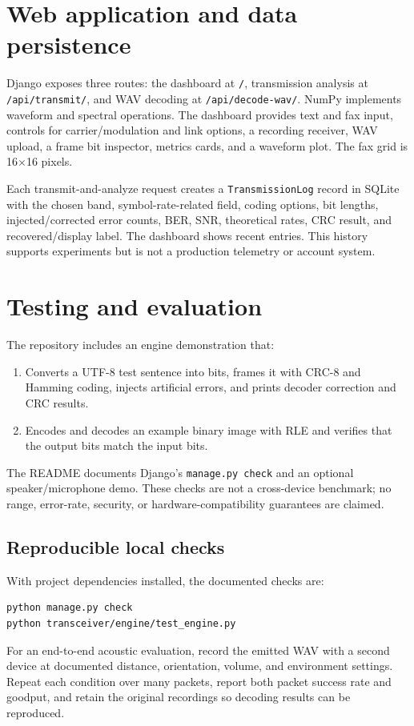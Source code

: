 \documentclass[11pt,a4paper]{article}
\begin{document}
\section{Web application and data persistence}
\label{sec:web}

Django exposes three routes: the dashboard at \texttt{/}, transmission analysis at \texttt{/api/transmit/}, and WAV decoding at \texttt{/api/decode-wav/}. NumPy implements waveform and spectral operations. The dashboard provides text and fax input, controls for carrier/modulation and link options, a recording receiver, WAV upload, a frame bit inspector, metrics cards, and a waveform plot. The fax grid is 16$\times$16 pixels.

Each transmit-and-analyze request creates a \texttt{TransmissionLog} record in SQLite with the chosen band, symbol-rate-related field, coding options, bit lengths, injected/corrected error counts, BER, SNR, theoretical rates, CRC result, and recovered/display label. The dashboard shows recent entries. This history supports experiments but is not a production telemetry or account system.

\section{Testing and evaluation}
\label{sec:testing}

The repository includes an engine demonstration that:
\begin{enumerate}
    \item Converts a UTF-8 test sentence into bits, frames it with CRC-8 and Hamming coding, injects artificial errors, and prints decoder correction and CRC results.
    \item Encodes and decodes an example binary image with RLE and verifies that the output bits match the input bits.
\end{enumerate}
The README documents Django's \texttt{manage.py check} and an optional speaker/microphone demo. These checks are not a cross-device benchmark; no range, error-rate, security, or hardware-compatibility guarantees are claimed.

\subsection{Reproducible local checks}
With project dependencies installed, the documented checks are:
\begin{lstlisting}[basicstyle=\ttfamily\small,frame=single,backgroundcolor=\color{lightgray}]
python manage.py check
python transceiver/engine/test_engine.py
\end{lstlisting}
For an end-to-end acoustic evaluation, record the emitted WAV with a second device at documented distance, orientation, volume, and environment settings. Repeat each condition over many packets, report both packet success rate and goodput, and retain the original recordings so decoding results can be reproduced.
\end{document}
